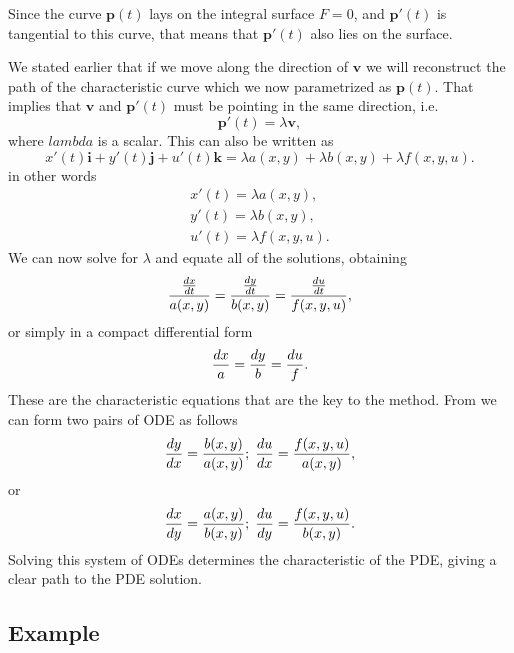 Since the curve $\mathbf{p}(t)$ lays on the integral surface $F = 0$, and
$\mathbf{p}'(t)$ is tangential to this curve, that means that $\mathbf{p}'(t)$
also lies on the surface.

We stated earlier that if we move along the direction of $\mathbf{v}$ we will
reconstruct the path of the characteristic curve which we now parametrized as
$\mathbf{p}(t)$. That implies that $\mathbf{v}$ and $\mathbf{p}'(t)$ must be
pointing in the same direction, i.e.
\begin{equation}
  \mathbf{p}'(t) = \lambda \mathbf{v},
\end{equation}
where $lambda$ is a scalar. This can also be written as
\begin{equation}
  x'(t)\mathbf{i} + y'(t)\mathbf{j} + u'(t)\mathbf{k} =
  \lambda a(x,y) + \lambda b(x,y) + \lambda f(x,y,u).
\end{equation}
in other words
\begin{align}
  x'(t) = \lambda a(x,y),\\
  y'(t) = \lambda b(x,y), \\
  u'(t) = \lambda f(x,y,u).
\end{align}
We can now solve for $\lambda$ and equate all of the solutions, obtaining
\begin{equation}
  {{dx \over dt} \over a(x,y)} =
  {{dy \over dt} \over b(x,y)} =
  {{du \over dt} \over f(x,y,u)},
  \label{eq_char_eq}
\end{equation}
or simply in a compact differential form
\begin{equation}
  {dx \over a} = {dy \over b} = {du \over f}.
\end{equation}
These are the characteristic equations that are the key to the method. From
\eref[eq_char_eq] we can form two pairs of ODE as follows
\begin{equation}
  {dy \over dx} = {b(x,y) \over a(x,y)}; \;
  {du \over dx} = {f(x,y,u)\over a(x,y)},
\end{equation}
or
\begin{equation}
  {dx \over dy} = {a(x,y) \over b(x,y)}; \;
  {du \over dy} = {f(x,y,u)\over b(x,y)}.
\end{equation}
Solving this system of ODEs determines the characteristic of the PDE, giving
a clear path to the PDE solution.

\subsection{Example}

